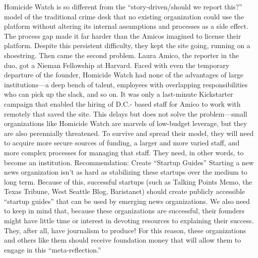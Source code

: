Homicide Watch is so different from the ``story-driven/should we report this?''
model of the traditional crime desk that no existing organization could use the
platform without altering its internal assumptions and processes as a side effect.
The process gap made it far harder than the Amicos imagined to license their
platform.
Despite this persistent difficulty, they kept the site going, running on a shoestring.
Then came the second problem. Laura Amico, the reporter in the duo, got a
Nieman Fellowship at Harvard. Faced with even the temporary departure of the
founder, Homicide Watch had none of the advantages of large institutions—a
deep bench of talent, employees with overlapping responsibilities who can pick
up the slack, and so on.
It was only a last-minute Kickstarter campaign that enabled the hiring of D.C.-
based staff for Amico to work with remotely that saved the site. This delays but
does not solve the problem—small organizations like Homicide Watch are marvels
of low-budget leverage, but they are also perennially threatened. To survive
and spread their model, they will need to acquire more secure sources of funding,
a larger and more varied staff, and more complex processes for managing that
staff. They need, in other words, to become an institution.
Recommendation: Create ``Startup Guides''
Starting a new news organization isn’t as hard as stabilizing these startups
over the medium to long term. Because of this, successful startups
(such as Talking Points Memo, the Texas Tribune, West Seattle Blog,
Baristanet) should create publicly accessible ``startup guides'' that can be
used by emerging news organizations.
We also need to keep in mind that, because these organizations are
successful, their founders might have little time or interest in devoting
resources to explaining their success. They, after all, have journalism
to produce! For this reason, these organizations and others like them
should receive foundation money that will allow them to engage in this
``meta-reflection.''

